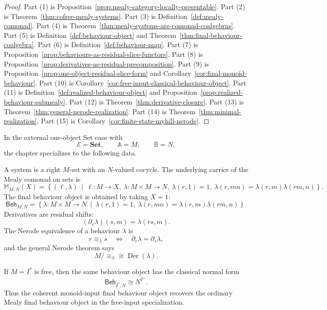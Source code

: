 \begin{proof}
Part (1) is Proposition~\ref{prop:mealy-category-locally-presentable}. Part
(2) is Theorem~\ref{thm:cofree-mealy-systems}. Part (3) is
Definition~\ref{def:mealy-comonad}. Part (4) is
Theorem~\ref{thm:mealy-systems-are-comonad-coalgebras}. Part (5) is
Definition~\ref{def:behaviour-object} and
Theorem~\ref{thm:final-behaviour-coalgebra}. Part (6) is
Definition~\ref{def:behaviour-map}. Part (7) is
Proposition~\ref{prop:behaviours-as-residual-slice-functors}. Part (8) is
Proposition~\ref{prop:derivatives-as-residual-precomposition}. Part (9) is
Proposition~\ref{prop:one-object-residual-slice-form} and
Corollary~\ref{cor:final-monoid-behaviour}. Part (10) is
Corollary~\ref{cor:free-input-classical-behaviour-object}. Part (11) is
Definition~\ref{def:realized-behaviour-object} and
Proposition~\ref{prop:realized-behaviour-submealy}. Part (12) is
Theorem~\ref{thm:derivative-closure}. Part (13) is
Theorem~\ref{thm:general-nerode-realization}. Part (14) is
Theorem~\ref{thm:minimal-realization}. Part (15) is
Corollary~\ref{cor:finite-state-myhill-nerode}.
\end{proof}

\begin{remark}
\label{rem:final-one-object-summary}
In the external one-object Set case with
\[
\mathcal E=\mathbf{Set},
\qquad
\mathbb A=M,
\qquad
\mathbb B=N,
\]
the chapter specializes to the following data.

A system is a right \(M\)-set with an \(N\)-valued cocycle. The underlying
carrier of the Mealy comonad on sets is
\[
\mathbb M_{M,N}(X)
=
\left\{
(\ell,\lambda)
\ \middle|\
\ell:M\to X,\
\lambda:M\times M\to N,\
\lambda(r,1)=1,\
\lambda(r,mn)=\lambda(r,m)\lambda(rm,n)
\right\}.
\]
The final behaviour object is obtained by taking \(X=1\):
\[
\mathsf{Beh}_{M,N}
=
\left\{
\lambda:M\times M\to N
\ \middle|\
\lambda(r,1)=1,\
\lambda(r,mn)=\lambda(r,m)\lambda(rm,n)
\right\}.
\]
Derivatives are residual shifts:
\[
(\partial_r\lambda)(s,m)=\lambda(rs,m).
\]
The Nerode equivalence of a behaviour \(\lambda\) is
\[
r\equiv_\lambda s
\quad\Longleftrightarrow\quad
\partial_r\lambda=\partial_s\lambda,
\]
and the general Nerode theorem says
\[
M/{\equiv_\lambda}
\cong
\operatorname{Der}(\lambda).
\]

If \(M=I^\ast\) is free, then the same behaviour object has the classical
normal form
\[
\mathsf{Beh}_{I^\ast,N}
\cong
N^{I^+}.
\]
Thus the coherent monoid-input final behaviour object recovers the ordinary
Mealy final behaviour object in the free-input specialization.
\end{remark}